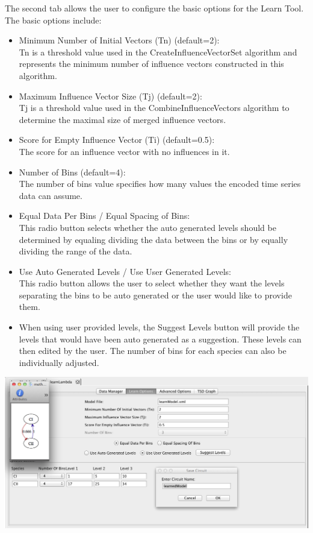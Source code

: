 \documentclass[titlepage,11pt]{article}
\begin{document}
\noindent
The second tab allows the user to configure the basic options for the Learn Tool.  The basic options include:
\begin{itemize}
\item Minimum Number of Initial Vectors (Tn) (default=2): \\
Tn is a threshold value used in the CreateInfluenceVectorSet algorithm and represents the minimum number of influence vectors constructed in this algorithm.
\item Maximum Influence Vector Size (Tj) (default=2): \\
Tj is a threshold value used in the CombineInfluenceVectors algorithm to determine the maximal size of merged influence vectors.
\item Score for Empty Influence Vector (Ti) (default=0.5): \\
The score for an influence vector with no influences in it.
\item Number of Bins (default=4): \\
The number of bins value specifies how many values the encoded time series data can assume.
\item Equal Data Per Bins / Equal Spacing of Bins: \\
This radio button selects whether the auto generated levels should be determined by equaling dividing the data between the bins or by equally dividing the range of the data. 
\item Use Auto Generated Levels / Use User Generated Levels: \\
This radio button allows the user to select whether they want the levels separating the bins to be auto generated or the user would like to provide them. 
\item When using user provided levels, the Suggest Levels button will provide the levels that would have been auto
generated as a suggestion. These levels can then edited by the user.  The number of bins for each species can also be individually adjusted.  
\end{itemize}

\begin{center}
\includegraphics[width=160mm]{screenshots/learn}
\end{center}
\end{document}
